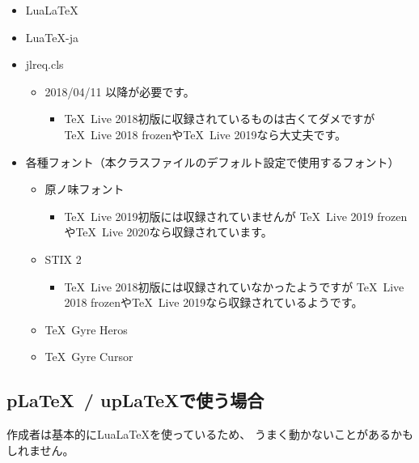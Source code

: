 \documentclass{FITpaper}
\begin{document}
\begin{itemize}
\item Lua\LaTeX
\item Lua\TeX -ja
\item jlreq.cls
  \begin{itemize}
  \item 2018/04/11 以降が必要です。
    \begin{itemize}
    \item \TeX~Live 2018初版に収録されているものは古くてダメですが
      \TeX~Live 2018 frozenや\TeX~Live 2019なら大丈夫です。
    \end{itemize}
  \end{itemize}
\item 各種フォント（本クラスファイルのデフォルト設定で使用するフォント）
  \begin{itemize}
  \item 原ノ味フォント
    \begin{itemize}
    \item \TeX~Live 2019初版には収録されていませんが
      \TeX~Live 2019 frozenや\TeX~Live 2020なら収録されています。
    \end{itemize}
  \item STIX 2
    \begin{itemize}
    \item \TeX~Live 2018初版には収録されていなかったようですが
      \TeX~Live 2018 frozenや\TeX~Live 2019なら収録されているようです。
    \end{itemize}
  \item \TeX~Gyre Heros
  \item \TeX~Gyre Cursor
  \end{itemize}
\end{itemize}

\subsection{p\LaTeX~/ up\LaTeX で使う場合}

作成者は基本的にLua\LaTeX を使っているため、
うまく動かないことがあるかもしれません。
\end{document}
